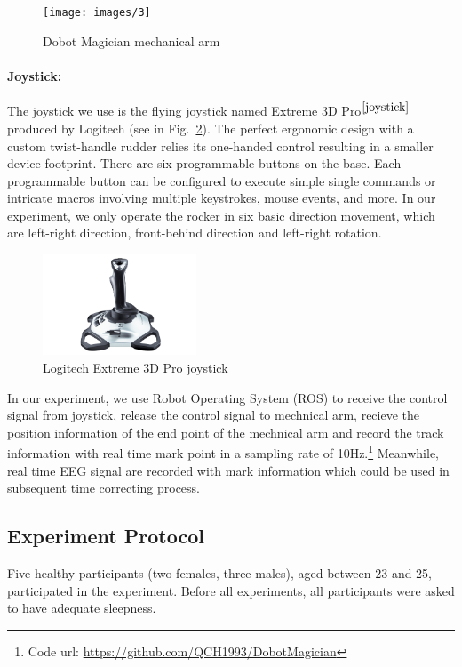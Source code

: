 \documentclass[runningheads,a4paper]{llncs}
\begin{document}
\begin{figure}
    \centering
    \texttt{[image: images/3]}
    \caption{Dobot Magician mechanical arm}
    \label{fig:dobot}
\end{figure}

\paragraph{Joystick:}
The joystick we use is the flying joystick named Extreme 3D
Pro$^{\cite{joystick}}$ produced by Logitech (see in Fig.~\ref{fig:joystick}).
The perfect ergonomic design with a custom twist-handle rudder relies
its one-handed control resulting in a smaller device footprint.
There are six programmable buttons on the base.
Each programmable button can be configured to execute simple single commands or
intricate macros involving multiple keystrokes, mouse events, and more.
In our experiment, we only operate the rocker in six basic direction movement,
which are left-right direction, front-behind direction and left-right rotation.

\begin{figure}
    \centering
    \includegraphics[height=3cm]{images/4}
    \caption{Logitech Extreme 3D Pro joystick}
    \label{fig:joystick}
\end{figure}

In our experiment, we use Robot Operating System (ROS) to receive the control
signal from joystick, release the control signal to mechnical arm, recieve the
position information of the end point of the mechnical arm and record the track
information with real time mark point in a sampling rate of
10Hz.\footnote{Code url: \url{https://github.com/QCH1993/DobotMagician}} Meanwhile,
real time EEG signal are recorded with mark information which could be used in
subsequent time correcting process.

\subsection{Experiment Protocol}
Five healthy participants (two females, three males), aged between 23 and 25,
participated in the experiment. Before all experiments, all participants were
asked to have adequate sleepness.
\end{document}
